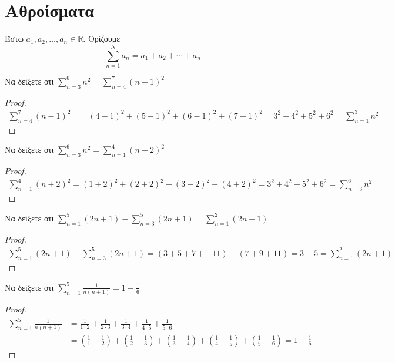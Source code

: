 \documentclass[main.tex]{subfiles}
\begin{document}
\section{Αθροίσματα}

\begin{dfn}
    Έστω $ a_{1}, a_{2}, \ldots, a_{n} \in \mathbb{R} $. Ορίζουμε 
    \[ \sum_{n=1}^{N} a_{n} = a_{1} + a_{2} + \cdots + a_{n} \]
\end{dfn}

\begin{example}
    Να δείξετε ότι $ \sum_{n=3}^{6} n^{2} = \sum_{n=4}^{7} (n-1)^{2}   $
\end{example}

\begin{proof}
    \begin{align*}
        \sum_{n=4}^{7} (n-1)^{2} &= (4-1)^{2}+(5-1)^{2}+(6-1)^{2}+(7-1)^{2} = 3^{2}+4^{2}+5^{2}+6^{2} = \sum_{n=1}^{3} n^{2} 
    \end{align*}
\end{proof}

\begin{example}
    Να δείξετε ότι $ \sum_{n=3}^{6} n^{2} = \sum_{n=1}^{4} (n+2)^{2}   $
\end{example}
 
\begin{proof}
    \begin{align*}
        \sum_{n=1}^{4} (n+2)^{2} = (1+2)^{2}+(2+2)^{2}+(3+2)^{2}+(4+2)^{2}=
        3^{2}+4^{2}+5^{2}+6^{2} = \sum_{n=3}^{6} n^{2} 
 \end{align*}
\end{proof}

\begin{example}
    Να δείξετε ότι $ \sum_{n=1}^{5} (2n+1) - \sum_{n=3}^{5} (2n+1)  =  
    \sum_{n=1}^{2} (2n+1) $
\end{example}

\begin{proof}
    \begin{align*}
        \sum_{n=1}^{5} (2n+1)- \sum_{n=3}^{5} (2n+1) = 
        (3+5+7++11) - (7+9+11) = 3 + 5 = \sum_{n=1}^{2} (2n+1) 
    \end{align*}
\end{proof}

\begin{example}
    Να δείξετε ότι $ \sum_{n=1}^{5} \frac{1}{n(n+1)} = 1 - \frac{1}{6}  $
\end{example}

\begin{proof}
    \begin{align*}
        \sum_{n=1}^{5} \frac{1}{n(n+1)} &= \frac{1}{1\cdot 2} + \frac{1}{
        2 \cdot 3} + \frac{1}{3 \cdot 4} + \frac{1}{4 \cdot 5} + \frac{1}{
    5 \cdot 6} \\
    &= \left(\frac{1}{1} - \frac{1}{2}\right) + \left(\frac{1}{2} - \frac{1}{3}
    \right) + \left(\frac{1}{3} - \frac{1}{4}\right) + \left(\frac{1}{4} - \frac{1}{5}\right) +
    \left(\frac{1}{5} - \frac{1}{6}\right)  = 1 - \frac{1}{6}
    \end{align*}
\end{proof}
\end{document}
